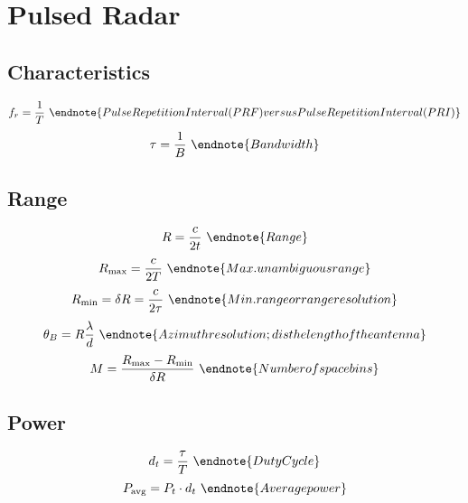 \section{Pulsed Radar}
\subsection{Characteristics}
\begin{multicols}{2} \noindent
	$$ f_r = \frac{1}{T} \
		\endnote{Pulse Repetition Interval (PRF) versus Pulse Repetition
			Interval (PRI)}
		$$
	$$ \tau = \frac{1}{B} \
		\endnote{Bandwidth}
		$$
\end{multicols}

\subsection{Range}
\begin{multicols}{4} \noindent
	$$ R = \frac{c}{2t} \
		\endnote{Range}
		$$
	$$ R_\text{max} = \frac{c}{2T} \
		\endnote{Max. unambiguous range}
		$$
	$$ R_\text{min} = \delta R = \frac{c}{2 \tau} \
		\endnote{Min. range or range resolution}
		$$
	$$ \theta_B = R \frac{\lambda}{d} \
		\endnote{Azimuth resolution; d is the length of the antenna}
		$$
	$$ M = \frac{R_\text{max} - R_\text{min}}{\delta R} \
		\endnote{Number of space bins}
		$$
\end{multicols}

\subsection{Power}
\begin{multicols}{2} \noindent
	$$d_t = \frac{\tau}{T} \
		\endnote{Duty Cycle}
		$$
	$$ P_\text{avg} = P_t \cdot d_t \
		\endnote{Average power}
		$$
\end{multicols}
\printendnotes[itemize]
